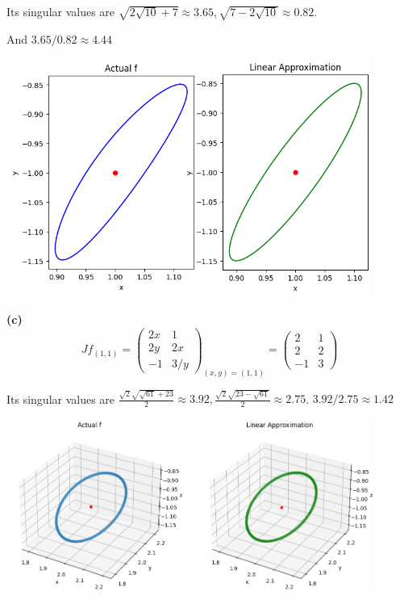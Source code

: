 \documentclass[a4paper, 12pt]{article}
\begin{document}
\begin{solution}
    Its singular values are $\sqrt{2\sqrt{10} + 7} \approx 3.65, \sqrt{7 - 2\sqrt{10}} \approx 0.82$.

    And $3.65/0.82 \approx 4.44$
    \begin{center}
        \includegraphics[width= 12cm]{./figures/6.8b.png}
    \end{center}

    \textbf{(c)}
    \[
    Jf_{(1, 1)} = \begin{pmatrix}
    2x & 1\\
    2y & 2x \\
    -1 & 3/y
    \end{pmatrix}_{(x, y) = (1, 1)} = \begin{pmatrix}
    2 & 1 \\
    2 & 2 \\
    -1 & 3
    \end{pmatrix}
    \]

    Its singular values are $\frac{\sqrt{2} \sqrt{\sqrt{61} + 23}}{2} \approx 3.92, \frac{\sqrt{2}\sqrt{23 - \sqrt{61}}}{2} \approx 2.75$.
    $3.92/2.75 \approx 1.42$
    \begin{center}
        \includegraphics[width= 12cm]{./figures/6.8c.png}
    \end{center}


\end{solution}
\end{document}
